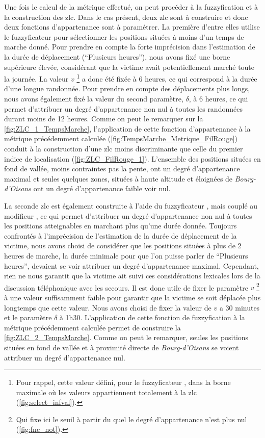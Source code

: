 Une fois le calcul de la métrique effectué, on peut procéder à la
fuzzyfication et à la construction des \ac{zlc}. Dans le cas présent,
deux \ac{zlc} sont à construire et donc deux fonctions d'appartenance
sont à paramétrer. La première d'entre elles utilise le fuzzyficateur
 pour sélectionner les positions situées à moins
d'un temps de marche donné. Pour prendre en compte la forte
imprécision dans l'estimation de la durée de déplacement
(\enquote{Plusieurs heures}), nous avons fixé une borne supérieure
élevée, considérant que la victime avait potentiellement marché toute
la journée. La valeur \(v\) \footnote{Pour rappel, cette valeur
  défini, pour le fuzzyficateur , dans la borne
  maximale où les valeurs appartiennent totalement à la \ac{zlc}
  (\autoref{fig:select_infval}).} a donc été fixée à 6 heures, ce qui
correspond à la durée d'une longue randonnée. Pour prendre en compte
des déplacements plus longs, nous avons également fixé la valeur du
second paramètre, \(\delta\), à 6 heures, ce qui permet d'attribuer un
degré d'appartenance non nul à toutes les randonnées durant moins de
12 heures. Comme on peut le remarquer sur la
\autoref{fig:ZLC_1_TempsMarche}, l’application de cette fonction
d'appartenance à la métrique précédemment calculée
(\autoref{fig:TempsMarche_Metrique_FilRouge}) conduit à la
construction d'une \ac{zlc} moins discriminante que celle du premier
indice de localisation (\autoref{fig:ZLC_FilRouge_1}). L'ensemble des
positions situées en fond de vallée, moins contraintes pas la pente,
ont un degré d'appartenance maximal et seules quelques zones, situées
à haute altitude et éloignées de \emph{Bourg-d'Oisans} ont un degré
d'appartenance faible voir nul.

La seconde \ac{zlc} est également construite à l'aide du fuzzyficateur
, mais couplé au modifieur , ce
qui permet d'attribuer un degré d'appartenance non nul à toutes les
positions atteignables en marchant plus qu'une durée donnée. Toujours
confrontés à l'imprécision de l'estimation de la durée de déplacement
de la victime, nous avons choisi de considérer que les positions
situées à plus de 2 heures de marche, la durée minimale pour que l'on
puisse parler de \enquote{Plusieurs heures}, devaient se voir
attribuer un degré d'appartenance maximal. Cependant, rien ne nous
garantit que la victime ait suivi ces considérations lexicales lors de
la discussion téléphonique avec les secours. Il est donc utile de
fixer le paramètre \(v\) \footnote{Qui fixe ici le seuil à partir du
  quel le degré d'appartenance n'est plus nul
  (\autoref{fig:fnc_not}).} à une valeur suffisamment faible pour
garantir que la victime se soit déplacée plus longtemps que cette
valeur. Nous avons choisi de fixer la valeur de \(v\) a 30 minutes et
le paramètre \(\delta\) à 1h30. L’application de cette fonction de
fuzzyfication à la métrique précédemment calculée permet de construire
la \autoref{fig:ZLC_2_TempsMarche}. Comme on peut le remarquer, seules
les positions situées en fond de vallée et à proximité directe de
\emph{Bourg-d'Oisans} se voient attribuer un degré d'appartenance nul.

